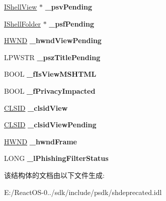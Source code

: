 \begin{DoxyCompactItemize}
\hyperlink{interface_i_shell_view}{I\+Shell\+View} $\ast$ {\bfseries \+\_\+psv\+Pending}
\item 
\mbox{\label{structbasebrowserdatalh_aa77f8ec0feecb5c7d610e2bfaaed7973}} 
\hyperlink{interface_i_shell_folder}{I\+Shell\+Folder} $\ast$ {\bfseries \+\_\+psf\+Pending}
\item 
\mbox{\label{structbasebrowserdatalh_aec0eeb0e401f0f6ab308932bfd1f35e9}} 
\hyperlink{interfacevoid}{H\+W\+ND} {\bfseries \+\_\+hwnd\+View\+Pending}
\item 
\mbox{\label{structbasebrowserdatalh_a8938e258469ca161087a07c0cd410375}} 
L\+P\+W\+S\+TR {\bfseries \+\_\+psz\+Title\+Pending}
\item 
\mbox{\label{structbasebrowserdatalh_ab075b8e24e6f8adb8cd88c510f7281f3}} 
B\+O\+OL {\bfseries \+\_\+f\+Is\+View\+M\+S\+H\+T\+ML}
\item 
\mbox{\label{structbasebrowserdatalh_af8c934823d7c7a096a1a7f89650191db}} 
B\+O\+OL {\bfseries \+\_\+f\+Privacy\+Impacted}
\item 
\mbox{\label{structbasebrowserdatalh_a037bab510502fb8317d74d2aee09a8f5}} 
\hyperlink{struct___i_i_d}{C\+L\+S\+ID} {\bfseries \+\_\+clsid\+View}
\item 
\mbox{\label{structbasebrowserdatalh_afa271f9349bc9f3993dc9227e1a5c11e}} 
\hyperlink{struct___i_i_d}{C\+L\+S\+ID} {\bfseries \+\_\+clsid\+View\+Pending}
\item 
\mbox{\label{structbasebrowserdatalh_ada42921d7d958ae70c71cbfad7540aad}} 
\hyperlink{interfacevoid}{H\+W\+ND} {\bfseries \+\_\+hwnd\+Frame}
\item 
\mbox{\label{structbasebrowserdatalh_a378e3100d3ec0184337b9ca0616dc098}} 
L\+O\+NG {\bfseries \+\_\+l\+Phishing\+Filter\+Status}
\end{DoxyCompactItemize}


该结构体的文档由以下文件生成\+:\begin{DoxyCompactItemize}
\item 
E\+:/\+React\+O\+S-\/0../sdk/include/psdk/shdeprecated.\+idl\end{DoxyCompactItemize}

